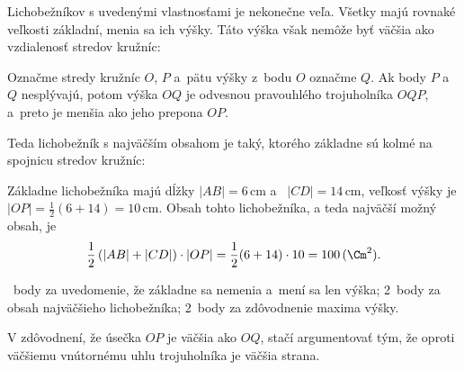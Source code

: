 {%
Lichobežníkov s uvedenými vlastnosťami je nekonečne veľa.
Všetky majú rovnaké veľkosti základní, menia sa ich výšky.
Táto výška však nemôže byť väčšia ako vzdialenosť stredov kružníc:
%

\noindent
Označme stredy kružníc $O$, $P$ a~pätu výšky z~bodu $O$ označme $Q$.
Ak body $P$ a~$Q$ nesplývajú, potom výška $OQ$ je odvesnou pravouhlého trojuholníka $OQP$, a~preto je menšia ako jeho prepona $OP$.

Teda lichobežník s najväčším obsahom je taký, ktorého základne sú kolmé na spojnicu stredov kružníc:
%

\noindent
Základne lichobežníka majú dĺžky $|AB|=6$\,cm a ~$|CD|=14$\,cm, veľkosť výšky je $|OP|=\frac12(6+14)=10$\,cm.
Obsah tohto lichobežníka, a teda najväčší možný obsah, je
$$
\frac12\left(|AB|+|CD|\right)\cdot|OP|
= \frac12(6+14)\cdot10
= 100\,(\Cm^2).
$$

~body za uvedomenie, že základne sa nemenia a~mení sa len výška;
2~body za obsah najväčšieho lichobežníka;
2~body za zdôvodnenie maxima výšky.

\poznamka
V zdôvodnení, že úsečka $OP$ je väčšia ako $OQ$, stačí argumentovať tým, že oproti väčšiemu vnútornému uhlu trojuholníka je väčšia strana.
\endhodnotenie
}

